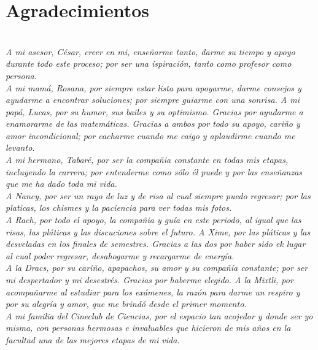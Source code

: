 \chapter*{Agradecimientos}

\textit{}\\

\textit{A mi asesor, C\'esar, creer en mi, ense\~{n}arme tanto, darme su tiempo
y apoyo durante todo este proceso; por ser una ispiraci\'on, tanto como profesor
como persona.}\\

\textit{A mi mam\'a, Rosana, por siempre estar lista para apoyarme, darme
consejos y ayudarme a encontrar soluciones;  por siempre guiarme con una
sonrisa. A mi pap\'a, Lucas,  por su humor, sus bailes y su optimismo. Gracias
por ayudarme a enamorarme de las matem\'aticas. Gracias a ambos por todo su
apoyo, cari\~{n}o y amor incondicional; por cacharme cuando me caigo y
aplaudirme cuando me levanto.}\\

\textit{A mi hermano, Tabar\'e, por ser la compa\~{n}ia constante en todas mis
etapas, incluyendo la carrera; por entenderme como s\'olo \'el puede y por las
ense\~{n}anzas que me ha dado toda mi vida.}\\

\textit{A Nancy, por ser un rayo de luz y de risa al cual siempre puedo
regresar; por las platicas, los chismes y la paciencia para ver todas mis
fotos.}\\

\textit{A Rach, por todo el apoyo, la compa\~{n}ia y gu\'ia en este periodo, al
igual que las risas, las pl\'aticas y las discuciones sobre el futuro. A Xime,
por las pl\'aticas y las desveladas en los finales de semestres. Gracias a las
dos por haber sido ek lugar al cual poder regresar, desahogarme y recargarme de
energ\'ia.} \\

\textit{A la Dracs, por su cari\~{n}o, apapachos, su amor y su compa\~{n}\'ia
constante; por ser mi despertador y mi desestr\'es. Gracias por haberme
elegido. A la Mixtli, por acompa\~{n}arme al estudiar para los ex\'amenes, la
raz\'on para darme un respiro y por su alegr\'ia y amor, que me brind\'o desde
el primer momento.}\\ 

\textit{A mi familia del Cineclub de Ciencias, por el espacio tan acojedor  y
donde ser yo misma, con personas hermosas e invaluables que hicieron de mis
a\~{n}os en la facultad una de las mejores etapas de mi vida.}\\

